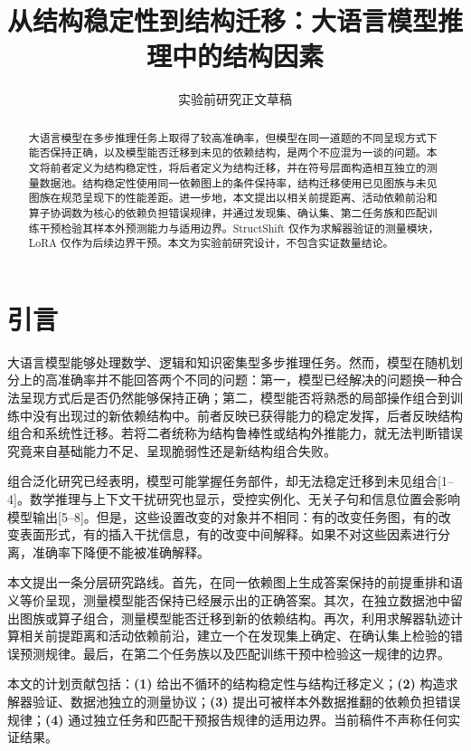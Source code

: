 \documentclass[UTF8,11pt,a4paper]{ctexart}
\title{从结构稳定性到结构迁移：大语言模型推理中的结构因素}
\author{}
\date{实验前研究正文草稿}
\theoremstyle{plain}
\begin{document}
\maketitle

\begin{abstract}
大语言模型在多步推理任务上取得了较高准确率，但模型在同一道题的不同呈现方式下能否保持正确，以及模型能否迁移到未见的依赖结构，是两个不应混为一谈的问题。本文将前者定义为结构稳定性，将后者定义为结构迁移，并在符号层面构造相互独立的测量数据池。结构稳定性使用同一依赖图上的条件保持率，结构迁移使用已见图族与未见图族在规范呈现下的性能差距。进一步地，本文提出以相关前提距离、活动依赖前沿和算子协调数为核心的依赖负担错误规律，并通过发现集、确认集、第二任务族和匹配训练干预检验其样本外预测能力与适用边界。StructShift 仅作为求解器验证的测量模块，LoRA 仅作为后续边界干预。本文为实验前研究设计，不包含实证数量结论。
\end{abstract}

\section{引言}

大语言模型能够处理数学、逻辑和知识密集型多步推理任务。然而，模型在随机划分上的高准确率并不能回答两个不同的问题：第一，模型已经解决的问题换一种合法呈现方式后是否仍然能够保持正确；第二，模型能否将熟悉的局部操作组合到训练中没有出现过的新依赖结构中。前者反映已获得能力的稳定发挥，后者反映结构组合和系统性迁移。若将二者统称为结构鲁棒性或结构外推能力，就无法判断错误究竟来自基础能力不足、呈现脆弱性还是新结构组合失败。

组合泛化研究已经表明，模型可能掌握任务部件，却无法稳定迁移到未见组合[1--4]。数学推理与上下文干扰研究也显示，受控实例化、无关子句和信息位置会影响模型输出[5--8]。但是，这些设置改变的对象并不相同：有的改变任务图，有的改变表面形式，有的插入干扰信息，有的改变中间解释。如果不对这些因素进行分离，准确率下降便不能被准确解释。

本文提出一条分层研究路线。首先，在同一依赖图上生成答案保持的前提重排和语义等价呈现，测量模型能否保持已经展示出的正确答案。其次，在独立数据池中留出图族或算子组合，测量模型能否迁移到新的依赖结构。再次，利用求解器轨迹计算相关前提距离和活动依赖前沿，建立一个在发现集上确定、在确认集上检验的错误预测规律。最后，在第二个任务族以及匹配训练干预中检验这一规律的边界。

本文的计划贡献包括：\textbf{(1)} 给出不循环的结构稳定性与结构迁移定义；\textbf{(2)} 构造求解器验证、数据池独立的测量协议；\textbf{(3)} 提出可被样本外数据推翻的依赖负担错误规律；\textbf{(4)} 通过独立任务和匹配干预报告规律的适用边界。当前稿件不声称任何实证结果。
\end{document}

